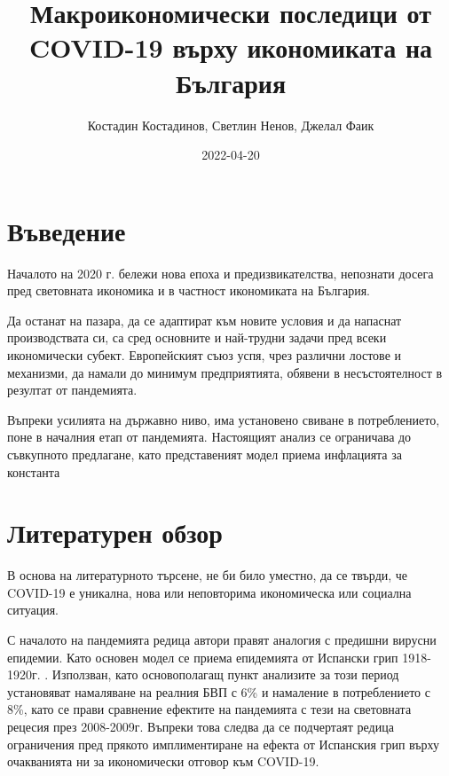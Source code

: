 \documentclass[a4paper,12pt]{article}
\title{Макроикономически последици от COVID-19 върху икономиката на България}
\date{2022-04-20}
\author{Костадин Костадинов, Светлин Ненов, Джелал Фаик}
\begin{document}
\maketitle

\section{Въведение}
Началото на 2020 г. бележи нова епоха и предизвикателства, непознати досега пред световната икономика и в частност икономиката на България.

Да останат на пазара, да се адаптират към новите условия и да напаснат производствата си, са сред основните и най-трудни задачи пред всеки икономически субект. Европейският съюз успя, чрез различни лостове и механизми, да намали до минимум предприятията, обявени в несъстоятелност в резултат от пандемията. 

Въпреки усилията на държавно ниво, има установено свиване в потреблението, поне в началния етап от пандемията. Настоящият анализ се ограничава до съвкупното предлагане, като представеният модел приема инфлацията за константа
\section{Литературен обзор}

В основа на литературното търсене, не би било уместно, да се твърди, че COVID-19 е уникална, нова или неповторима икономическа или социална ситуация\cite{https://doi.org/10.1111/joes.12423}. 

С началото на пандемията редица автори правят аналогия с предишни вирусни епидемии. Като основен модел се приема епидемията от Испански грип 1918-1920г. \cite{barro_coronavirus_2020}. Използван, като основополагащ пункт анализите за този период установяват намаляване на реалния БВП с 6\% и намаление в потреблението с 8\%, като се прави сравнение ефектите на пандемията с тези на световната рецесия през 2008-2009г. Въпреки това следва да се подчертаят редица ограничения пред прякото имплиментиране на ефекта от Испанския грип върху очакванията ни за икономически отговор към COVID-19\cite{eichenbaum_epidemics_2020-1}. 
\end{document}
